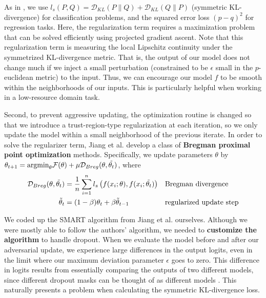 \documentclass{article}
\begin{document}
As in \cite{smart}, we use $l_{s}(P, Q) = \mathcal{D}_{KL}(P \lVert Q) + \mathcal{D}_{KL}(Q \lVert P)$ (symmetric KL-divergence) for classification problems, and the squared error loss $(p-q)^2$ for regression tasks. Here, the regularization term requires a maximization problem that can be solved efficiently using projected gradient ascent. Note that this regularization term is measuring the local Lipschitz continuity under the symmetrized KL-divergence metric. That is, the output of our model does not change much if we inject a small perturbation (constrained to be $\epsilon$ small in the $p$-euclidean metric) to the input. Thus, we can encourage our model $f$ to be smooth within the neighborhoods of our inputs. This is particularly helpful when working in a low-resource domain task. 

Second, to prevent aggressive updating, the optimization routine is changed so that we introduce a trust-region-type regularization at each iteration, so we only update the model within a small neighborhood of the previous iterate. In order to solve the regularizer term, Jiang et al. \cite{smart} develop a class of \textbf{Bregman proximal point optimization} methods. Specifically, we update parameters $\theta$ by $\theta_{t+1} = \text{argmin}_{\theta} \mathcal{F}(\theta) + \mu \mathcal{D}_{Breg}(\theta, \Tilde{\theta_{t}})$, where
\begin{align*}
\mathcal{D}_{Breg}(\theta, \Tilde{\theta_{t}}) & = \frac{1}{n} \sum_{i=1}^{n} l_{s} \left( f(x_{i}; \theta), f(x_{i}; \Tilde{\theta_{t}}) \right) && \text{Bregman divergence} \\
\Tilde{\theta}_{t} & = (1 - \beta)\theta_{t} + \beta \Tilde{\theta}_{t-1} && \text{regularized update step}
\end{align*}


We coded up the SMART algorithm from Jiang et al. \cite{smart} ourselves. Although we were mostly able to follow the authors' algorithm, we needed to \textbf{customize the algorithm} to handle dropout. When we evaluate the model before and after our adversarial update, we experience large differences in the output logits, even in the limit where our maximum deviation parameter $\epsilon$ goes to zero. This difference in logits results from essentially comparing the outputs of two different models, since different dropout masks can be thought of as different models \cite{dropout}. This naturally presents a problem when calculating the symmetric KL-divergence loss. 
\end{document}
